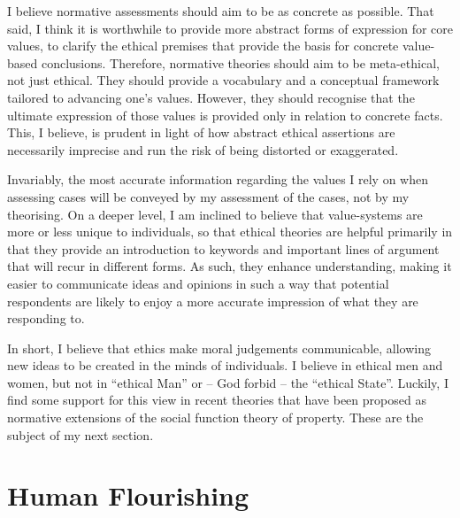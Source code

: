 I believe normative assessments should aim to be as concrete as possible. That said, I think it is worthwhile to provide more abstract forms of expression for core values, to clarify the ethical premises that provide the basis for concrete value-based conclusions. Therefore, normative theories should aim to be meta-ethical, not just ethical. They should provide a vocabulary and a conceptual framework tailored to advancing one's values. However, they should recognise that the ultimate expression of those values is provided only in relation to concrete facts. This, I believe, is prudent in light of how abstract ethical assertions are necessarily imprecise and run the risk of being distorted or exaggerated.

Invariably, the most accurate information regarding the values I rely on when assessing cases will be conveyed by my assessment of the cases, not by my theorising. On a deeper level, I am inclined to believe that value-systems are more or less unique to individuals, so that ethical theories are helpful primarily in that they provide an introduction to keywords and important lines of argument that will recur in different forms. As such, they enhance understanding, making it easier to communicate ideas and opinions in such a way that potential respondents are likely to enjoy a more accurate impression of what they are responding to. 

In short, I believe that ethics make moral judgements communicable, allowing new ideas to be created in the minds of individuals. I believe in ethical men and women, but not in ``ethical Man'' or -- God forbid --  the ``ethical State''. Luckily, I find some support for this view in recent theories that have been proposed as normative extensions of the social function theory of property. These are the subject of my next section.

\section{Human Flourishing}\label{sec:hf}

